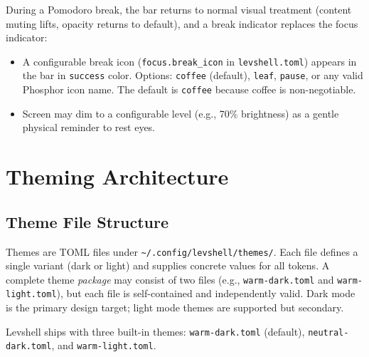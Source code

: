 \documentclass[11pt,a4paper]{article}
\begin{document}
During a Pomodoro break, the bar returns to normal visual treatment (content muting lifts, opacity returns to default), and a break indicator replaces the focus indicator:

\begin{itemize}[leftmargin=1.5em, itemsep=2pt]
  \item A configurable break icon (\texttt{focus.break\_icon} in \texttt{levshell.toml}) appears in the bar in \texttt{success} color. Options: \texttt{coffee} (default), \texttt{leaf}, \texttt{pause}, or any valid Phosphor icon name. The default is \texttt{coffee} because coffee is non-negotiable.
  \item Screen may dim to a configurable level (e.g., 70\% brightness) as a gentle physical reminder to rest eyes.
\end{itemize}


\section{Theming Architecture}
\label{sec:theming}

\subsection{Theme File Structure}

Themes are TOML files under \texttt{\textasciitilde/.config/levshell/themes/}. Each file defines a single variant (dark or light) and supplies concrete values for all tokens. A complete theme \emph{package} may consist of two files (e.g., \texttt{warm-dark.toml} and \texttt{warm-light.toml}), but each file is self-contained and independently valid. Dark mode is the primary design target; light mode themes are supported but secondary.

Levshell ships with three built-in themes: \texttt{warm-dark.toml} (default), \texttt{neutral-dark.toml}, and \texttt{warm-light.toml}.
\end{document}

